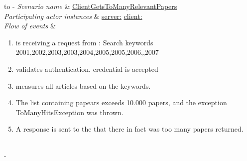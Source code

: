%
%
\begin{table}[h!]
	\tabulinesep=1.5mm
	\begin{tabu} to 
		\tabucline[1.5pt]-
		\textit{Scenario name} & \underline{ClientGetsToManyRelevantPapers} \\
		\hline
		\textit{Participating actor \newline instances} & \underline{server:\serverside}
		\newline \underline{client:\clientside} \\
		\hline
		\textit{Flow of events} &
		\vspace{-3mm}
		\begin{enumerate}[leftmargin=*,topsep=0pt,itemsep=-1ex]
			\item \serverside is receiving a request from \clientside: Search keywords {2001,2002,2003,2003,2004,2005,2005,2006,,2007}
						
			\item \serverside validates \user authentication. \user credential is accepted
			
			\item \serverside measures all articles based on the keywords.
			
			\item The list containing papears exceeds 10.000 papers, and the exception ToManyHitsException was thrown.
			
			\item A response is sent to the \clientside that there in fact was too many papers returned.\\				
		\end{enumerate} \\
		\tabucline[1.5pt]-
	\end{tabu}
	\caption{Scenario when a user has requested to many papers during one request.}
	\label{sc:ClientGetsToManyRelevantPapers}
\end{table}



